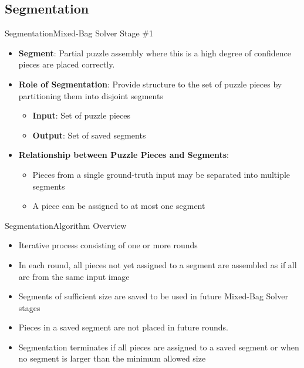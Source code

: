 \documentclass[10pt]{beamer}
\begin{document}
\subsection{Segmentation}
\begin{frame}{Segmentation}{Mixed-Bag Solver Stage \#1}
  \begin{itemize}
    \item \textbf{Segment}: Partial puzzle assembly where this is a high degree of confidence pieces are placed correctly.
    \vfill
    \item \textbf{Role of Segmentation}: Provide structure to the set of puzzle pieces by partitioning them into disjoint segments
    \begin{itemize}
      \vspace{0.4em}
      	\item \textbf{Input}: Set of puzzle pieces
  		  \vspace{0.6em}
      \item \textbf{Output}: Set of saved segments
    \end{itemize}
	  \vfill
	  \item \textbf{Relationship between Puzzle Pieces and Segments}:
	  \vspace{0.4em}
	  \begin{itemize}
      \item Pieces from a single ground-truth input may be separated into multiple segments
  	  \vspace{0.6em}   
      \item A piece can be assigned to at most one segment   
    \end{itemize}
  \end{itemize}
\end{frame}



\begin{frame}{Segmentation}{Algorithm Overview}
  \begin{itemize}
    \item Iterative process consisting of one or more rounds  
    \vfill
    \item In each round, all pieces not yet assigned to a segment are assembled as if all are from the same input image
    \vfill
    \item Segments of sufficient size are saved to be used in future Mixed-Bag Solver stages
    \vfill
    \item Pieces in a saved segment are not placed in future rounds.
    \vfill
    \item Segmentation terminates if all pieces are assigned to a saved segment or when no segment is larger than the minimum allowed size
    \vfill
  \end{itemize}
\end{frame}
\end{document}
